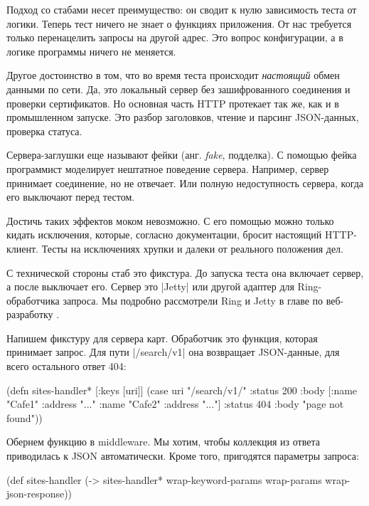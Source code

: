 Подход со стабами несет преимущество: он сводит к нулю зависимость теста от
логики. Теперь тест ничего не знает о функциях приложения. От нас требуется
только перенацелить запросы на другой адрес. Это вопрос конфигурации, а в логике
программы ничего не меняется.

Другое достоинство в том, что во время теста происходит \emph{настоящий} обмен
данными по сети. Да, это локальный сервер без зашифрованного соединения и
проверки сертификатов. Но основная часть HTTP протекает так же, как и в
промышленном запуске. Это разбор заголовков, чтение и парсинг JSON-данных,
проверка статуса.

Сервера-заглушки еще называют фейки (анг. \emph{fake}, подделка). С помощью
фейка программист моделирует нештатное поведение сервера. Например, сервер
принимает соединение, но не отвечает. Или полную недоступность сервера, когда
его выключают перед тестом.

Достичь таких эффектов моком невозможно. С его помощью можно только кидать
исключения, которые, согласно документации, бросит настоящий HTTP-клиент. Тесты
на исключениях хрупки и далеки от реального положения дел.

С технической стороны стаб это фикстура. До запуска теста она включает сервер, а
после выключает его. Сервер это \spverb|Jetty| или другой адаптер для
Ring-обработчика запроса. Мы подробно рассмотрели Ring и Jetty в главе по
веб-разработку .

Напишем фикстуру для сервера карт. Обработчик это функция, которая принимает
запрос. Для пути \spverb|/search/v1| она возвращает JSON-данные, для всего
остального ответ 404:

\begin{english}
  \begin{clojure}
(defn sites-handler* [{:keys [uri]}]
  (case uri
    "/search/v1/"
    {:status 200
     :body [{:name "Cafe1" :address "..."}
            {:name "Cafe2" :address "..."}]}
    {:status 404
     :body "page not found"}))
  \end{clojure}
\end{english}

Обернем функцию в middleware. Мы хотим, чтобы коллекция из ответа приводилась к
JSON автоматически. Кроме того, пригодятся параметры запроса:

\begin{english}
  \begin{clojure}
(def sites-handler
  (-> sites-handler*
      wrap-keyword-params
      wrap-params
      wrap-json-response))
  \end{clojure}
\end{english}

